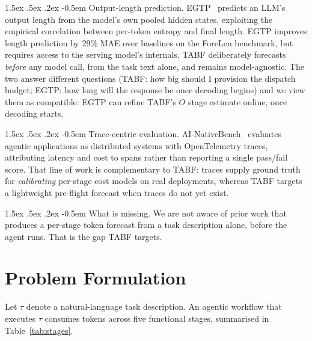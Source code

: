 \documentclass{article}
\makeatletter
\renewcommand\paragraph{%
  \@startsection{paragraph}{4}{\z@}%
    {1.5ex \@plus.5ex \@minus.2ex}%
    {-0.5em}%
    {\normalfont\normalsize\bfseries}%
}
\makeatother
\begin{document}
\paragraph{Output-length prediction.}
EGTP~\citep{xie2026egtp} predicts an LLM's output length from the
model's own pooled hidden states, exploiting the empirical correlation
between per-token entropy and final length. EGTP improves length
prediction by 29\% MAE over baselines on the ForeLen benchmark, but
requires access to the serving model's internals. TABF deliberately
forecasts \emph{before} any model call, from the task text alone, and
remains model-agnostic. The two answer different questions (TABF: how
big should I provision the dispatch budget; EGTP: how long will the
response be once decoding begins) and we view them as compatible:
EGTP can refine TABF's $O$ stage estimate online, once decoding starts.

\paragraph{Trace-centric evaluation.}
AI-NativeBench~\citep{wang2026ainativebench} evaluates agentic
applications as distributed systems with OpenTelemetry traces, attributing
latency and cost to spans rather than reporting a single pass/fail score.
That line of work is complementary to TABF: traces supply ground truth for
\emph{calibrating} per-stage cost models on real deployments, whereas TABF
targets a lightweight pre-flight forecast when traces do not yet exist.

\paragraph{What is missing.}
We are not aware of prior work that produces a per-stage token forecast
from a task description alone, before the agent runs. That is the gap
TABF targets.

\section{Problem Formulation}
\label{sec:problem}

Let $\tau$ denote a natural-language task description. An agentic
workflow that executes $\tau$ consumes tokens across five functional
stages, summarised in Table~\ref{tab:stages}.
\end{document}
